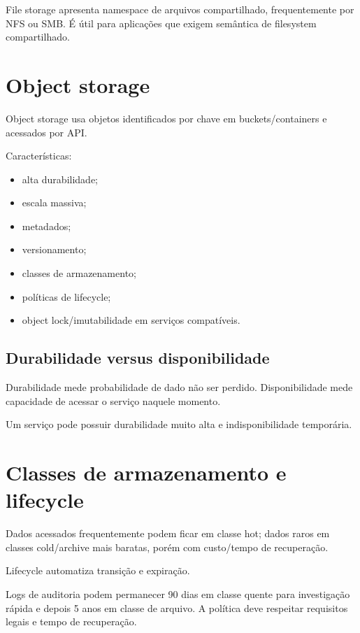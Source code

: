 File storage apresenta namespace de arquivos compartilhado, frequentemente por NFS ou SMB. É útil para aplicações que exigem semântica de filesystem compartilhado.

\section{Object storage}

Object storage usa objetos identificados por chave em buckets/containers e acessados por API.

Características:
\begin{itemize}
\item alta durabilidade;
\item escala massiva;
\item metadados;
\item versionamento;
\item classes de armazenamento;
\item políticas de lifecycle;
\item object lock/imutabilidade em serviços compatíveis.
\end{itemize}

\subsection{Durabilidade versus disponibilidade}

Durabilidade mede probabilidade de dado não ser perdido. Disponibilidade mede capacidade de acessar o serviço naquele momento.

Um serviço pode possuir durabilidade muito alta e indisponibilidade temporária.

\section{Classes de armazenamento e lifecycle}

Dados acessados frequentemente podem ficar em classe hot; dados raros em classes cold/archive mais baratas, porém com custo/tempo de recuperação.

Lifecycle automatiza transição e expiração.

\begin{exemplo}[retenção]
Logs de auditoria podem permanecer 90 dias em classe quente para investigação rápida e depois 5 anos em classe de arquivo. A política deve respeitar requisitos legais e tempo de recuperação.
\end{exemplo}

